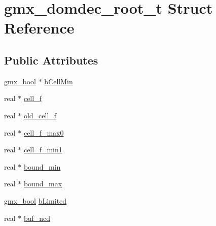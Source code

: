 \hypertarget{structgmx__domdec__root__t}{\section{gmx\-\_\-domdec\-\_\-root\-\_\-t \-Struct \-Reference}
\label{structgmx__domdec__root__t}
}
\subsection*{\-Public \-Attributes}
\begin{DoxyCompactItemize}
\item 
\hyperlink{include_2types_2simple_8h_a8fddad319f226e856400d190198d5151}{gmx\-\_\-bool} $\ast$ \hyperlink{structgmx__domdec__root__t_a94e19964c913d6010618ec9d8563e50d}{b\-Cell\-Min}
\item 
real $\ast$ \hyperlink{structgmx__domdec__root__t_a468d5778bf03d77cd4c1a1003b62f757}{cell\-\_\-f}
\item 
real $\ast$ \hyperlink{structgmx__domdec__root__t_a4db638ebdb9a007c9f5f67b7b92255fe}{old\-\_\-cell\-\_\-f}
\item 
real $\ast$ \hyperlink{structgmx__domdec__root__t_a22976c3f27ed8b5e5e8d5fc1725b794f}{cell\-\_\-f\-\_\-max0}
\item 
real $\ast$ \hyperlink{structgmx__domdec__root__t_a93b85e31887b82cc7d9edfc6e7d18f4a}{cell\-\_\-f\-\_\-min1}
\item 
real $\ast$ \hyperlink{structgmx__domdec__root__t_a3d78802825b259eee3a9507bc11e7cc1}{bound\-\_\-min}
\item 
real $\ast$ \hyperlink{structgmx__domdec__root__t_a9543f81c6f65327a85a333f752ef2479}{bound\-\_\-max}
\item 
\hyperlink{include_2types_2simple_8h_a8fddad319f226e856400d190198d5151}{gmx\-\_\-bool} \hyperlink{structgmx__domdec__root__t_acd10aa44f2f84b24fe14315e64894347}{b\-Limited}
\item 
real $\ast$ \hyperlink{structgmx__domdec__root__t_a6f9f5c491826260b18483301e7e1de77}{buf\-\_\-ncd}
\end{DoxyCompactItemize}


